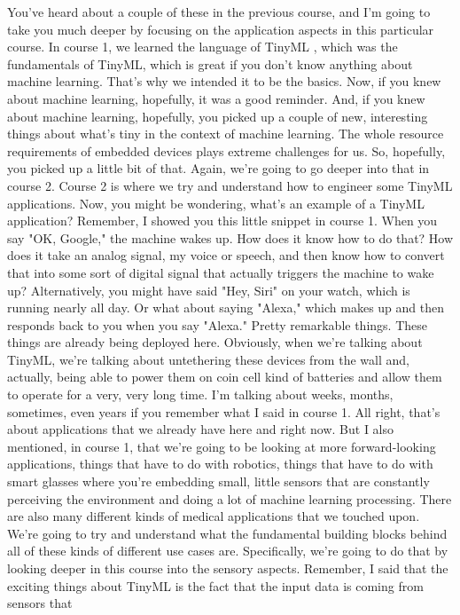 You've heard about a couple of these in the previous course,
and I'm going to take you much deeper by focusing on the application
aspects in this particular course.
In course 1, we learned the language of TinyML , which
was the fundamentals of TinyML, which is great if you don't know anything
about machine learning.
That's why we intended it to be the basics.
Now, if you knew about machine learning, hopefully, it was a good reminder.
And, if you knew about machine learning, hopefully,
you picked up a couple of new, interesting things
about what's tiny in the context of machine learning.
The whole resource requirements of embedded devices
plays extreme challenges for us.
So, hopefully, you picked up a little bit of that.
Again, we're going to go deeper into that in course 2.
Course 2 is where we try and understand how
to engineer some TinyML applications.
Now, you might be wondering, what's an example of a TinyML application?
Remember, I showed you this little snippet in course 1.
When you say "OK, Google," the machine wakes up.
How does it know how to do that?
How does it take an analog signal, my voice or speech,
and then know how to convert that into some sort of digital signal
that actually triggers the machine to wake up?
Alternatively, you might have said "Hey, Siri" on your watch, which
is running nearly all day.
Or what about saying "Alexa," which makes up and then
responds back to you when you say "Alexa."
Pretty remarkable things. These things are already being deployed here.
Obviously, when we're talking about TinyML,
we're talking about untethering these devices from the wall and, actually,
being able to power them on coin cell kind of batteries
and allow them to operate for a very, very long time.
I'm talking about weeks, months, sometimes,
even years if you remember what I said in course 1.
All right, that's about applications that we already
have here and right now.
But I also mentioned, in course 1, that we're
going to be looking at more forward-looking applications, things
that have to do with robotics, things that have to do with smart glasses
where you're embedding small, little sensors that are constantly
perceiving the environment and doing a lot of machine learning processing.
There are also many different kinds of medical applications
that we touched upon.
We're going to try and understand what the fundamental building
blocks behind all of these kinds of different use cases are.
Specifically, we're going to do that by looking deeper in this course
into the sensory aspects.
Remember, I said that the exciting things about TinyML
is the fact that the input data is coming from sensors that
